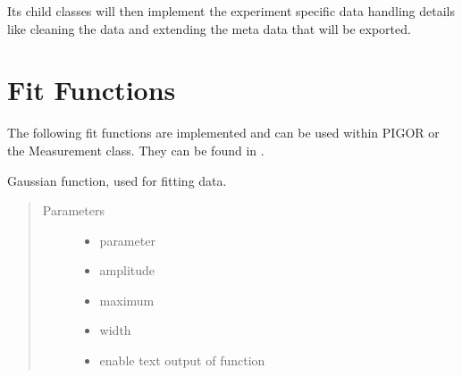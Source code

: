 \documentclass[letterpaper,10pt,english]{sphinxmanual}
\begin{document}
Its child classes will then implement the experiment specific data handling details like cleaning the data and extending the meta data that will be exported.


\chapter{Fit Functions}
\label{\detokenize{fit-functions:fit-functions}}\label{\detokenize{fit-functions::doc}}
The following fit functions are implemented and can be used within PIGOR or the Measurement class. They can be found in .

\label{\detokenize{fit-functions:module-fit_functions}}

\begin{fulllineitems}
\label{\detokenize{fit-functions:fit_functions.gauss}}
Gaussian function, used for fitting data.
\begin{quote}\begin{description}
\item[{Parameters}] \leavevmode\begin{itemize}
\item {} 
 \textendash{} parameter

\item {} 
 \textendash{} amplitude

\item {} 
 \textendash{} maximum

\item {} 
 \textendash{} width

\item {} 
 \textendash{} enable text output of function

\end{itemize}

\end{description}\end{quote}

\end{fulllineitems}
\end{document}
